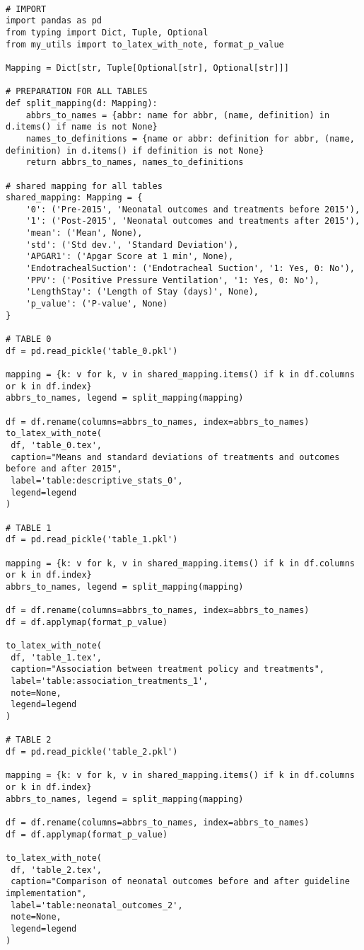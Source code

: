 \documentclass[11pt]{article}
\begin{document}
\begin{verbatim}

# IMPORT
import pandas as pd
from typing import Dict, Tuple, Optional
from my_utils import to_latex_with_note, format_p_value

Mapping = Dict[str, Tuple[Optional[str], Optional[str]]]

# PREPARATION FOR ALL TABLES
def split_mapping(d: Mapping):
    abbrs_to_names = {abbr: name for abbr, (name, definition) in d.items() if name is not None}
    names_to_definitions = {name or abbr: definition for abbr, (name, definition) in d.items() if definition is not None}
    return abbrs_to_names, names_to_definitions

# shared mapping for all tables
shared_mapping: Mapping = {
    '0': ('Pre-2015', 'Neonatal outcomes and treatments before 2015'),
    '1': ('Post-2015', 'Neonatal outcomes and treatments after 2015'),
    'mean': ('Mean', None),
    'std': ('Std dev.', 'Standard Deviation'),
    'APGAR1': ('Apgar Score at 1 min', None),
    'EndotrachealSuction': ('Endotracheal Suction', '1: Yes, 0: No'),
    'PPV': ('Positive Pressure Ventilation', '1: Yes, 0: No'),
    'LengthStay': ('Length of Stay (days)', None),
    'p_value': ('P-value', None)
}

# TABLE 0
df = pd.read_pickle('table_0.pkl')

mapping = {k: v for k, v in shared_mapping.items() if k in df.columns or k in df.index}
abbrs_to_names, legend = split_mapping(mapping)

df = df.rename(columns=abbrs_to_names, index=abbrs_to_names)
to_latex_with_note(
 df, 'table_0.tex',
 caption="Means and standard deviations of treatments and outcomes before and after 2015", 
 label='table:descriptive_stats_0',
 legend=legend
)

# TABLE 1
df = pd.read_pickle('table_1.pkl')

mapping = {k: v for k, v in shared_mapping.items() if k in df.columns or k in df.index}
abbrs_to_names, legend = split_mapping(mapping)

df = df.rename(columns=abbrs_to_names, index=abbrs_to_names)
df = df.applymap(format_p_value)

to_latex_with_note(
 df, 'table_1.tex',
 caption="Association between treatment policy and treatments", 
 label='table:association_treatments_1',
 note=None,
 legend=legend
)

# TABLE 2
df = pd.read_pickle('table_2.pkl')

mapping = {k: v for k, v in shared_mapping.items() if k in df.columns or k in df.index}
abbrs_to_names, legend = split_mapping(mapping)

df = df.rename(columns=abbrs_to_names, index=abbrs_to_names)
df = df.applymap(format_p_value)

to_latex_with_note(
 df, 'table_2.tex',
 caption="Comparison of neonatal outcomes before and after guideline implementation", 
 label='table:neonatal_outcomes_2',
 note=None,
 legend=legend
)


\end{verbatim}
\end{document}
